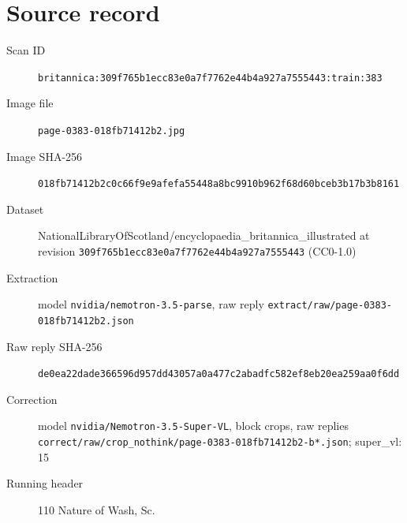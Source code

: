 \documentclass{article}
\begin{document}
\section*{Source record}
\begin{description}
\item[Scan ID] \texttt{britannica:309f765b1ecc83e0a7f7762e44b4a927a7555443:train:383}
\item[Image file] \texttt{page-0383-018fb71412b2.jpg}
\item[Image SHA-256] \texttt{018fb71412b2c0c66f9e9afefa55448a8bc9910b962f68d60bceb3b17b3b8161}
\item[Dataset] NationalLibraryOfScotland/encyclopaedia\_britannica\_illustrated at revision \texttt{309f765b1ecc83e0a7f7762e44b4a927a7555443} (CC0-1.0)
\item[Extraction] model \texttt{nvidia/nemotron-3.5-parse}, raw reply \texttt{extract/raw/page-0383-018fb71412b2.json}
\item[Raw reply SHA-256] \texttt{de0ea22dade366596d957dd43057a0a477c2abadfc582ef8eb20ea259aa0f6dd}
\item[Correction] model \texttt{nvidia/Nemotron-3.5-Super-VL}, block crops, raw replies \texttt{correct/raw/crop\_nothink/page-0383-018fb71412b2-b*.json}; super\_vl: 15
\item[Running header] 110 Nature of Wash, Sc.
\end{description}
\end{document}
